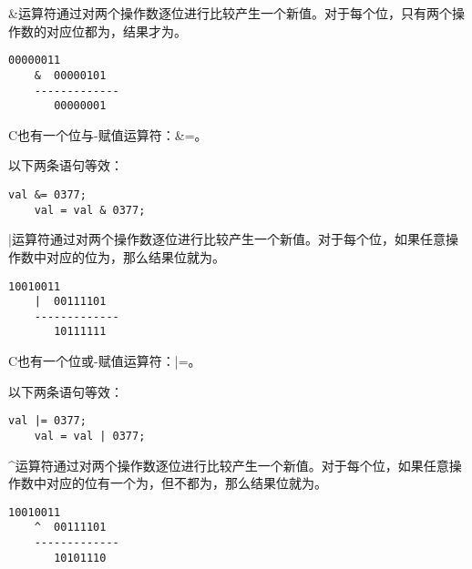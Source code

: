 \begin{frame}[fragile]

  {\tf \&}运算符通过对两个操作数逐位进行比较产生一个新值。对于每个位，只有两个操作数的对应位都为{}，结果才为{}。
  \begin{lstlisting}[backgroundcolor=\color{red!20}]
       00000011
    &  00000101
    -------------
       00000001
  \end{lstlisting}
\end{frame}

\begin{frame}[fragile]

  \begin{zhu}
    C也有一个位与-赋值运算符：{\tf \&=}。
  \end{zhu}
  以下两条语句等效：
  \begin{lstlisting}[backgroundcolor=\color{red!20}]
    val &= 0377;
    val = val & 0377;
  \end{lstlisting}
\end{frame}



\begin{frame}[fragile]

  {\tf |}运算符通过对两个操作数逐位进行比较产生一个新值。对于每个位，如果任意操作数中对应的位为{}，那么结果位就为{}。
  \begin{lstlisting}[backgroundcolor=\color{red!20}]
       10010011
    |  00111101
    -------------
       10111111
  \end{lstlisting}
\end{frame}


\begin{frame}[fragile]

  \begin{zhu}
    C也有一个位或-赋值运算符：{\tf |=}。
  \end{zhu}
  以下两条语句等效：
  \begin{lstlisting}[backgroundcolor=\color{red!20}]
    val |= 0377;
    val = val | 0377;
  \end{lstlisting}
\end{frame}

\begin{frame}[fragile]

  {\tf \^{}}运算符通过对两个操作数逐位进行比较产生一个新值。对于每个位，如果任意操作数中对应的位有一个为{}，但不都为{}，那么结果位就为{}。
  \begin{lstlisting}[backgroundcolor=\color{red!20}]
       10010011
    ^  00111101
    -------------
       10101110
  \end{lstlisting}
\end{frame}


